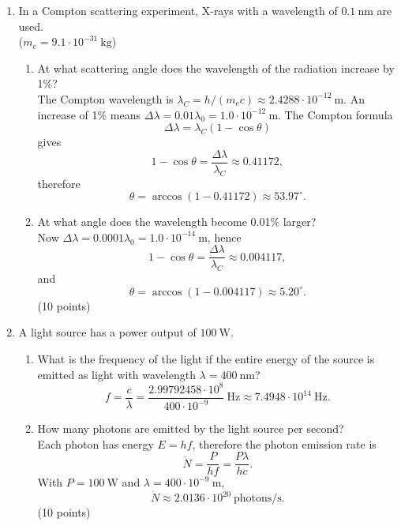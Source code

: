 \documentclass[12pt]{letter}
\begin{document}
\begin{enumerate}

\bigskip
\item In a Compton scattering experiment, X-rays with a wavelength of $0.1\ \text{nm}$ are used.\\
($m_e=9.1\cdot10^{-31}\ \text{kg}$)
\begin{enumerate}
\item At what scattering angle does the wavelength of the radiation increase by 1\%?\\
The Compton wavelength is $\lambda_C = h/(m_e c)\approx 2.4288\cdot10^{-12}\ \text{m}$. An increase of 1\% means $\Delta\lambda = 0.01\lambda_0 = 1.0\cdot10^{-12}\ \text{m}$. The Compton formula
$$ \Delta\lambda=\lambda_C(1-\cos\theta) $$  
gives
$$ 1-\cos\theta=\frac{\Delta\lambda}{\lambda_C}\approx 0.41172,$$
therefore
$$\theta=\arccos(1-0.41172)\approx 53.97^\circ. $$

\item At what angle does the wavelength become 0.01\% larger?\\
Now $\Delta\lambda=0.0001\lambda_0=1.0\cdot10^{-14}\ \text{m}$, hence
$$ 1-\cos\theta=\frac{\Delta\lambda}{\lambda_C}\approx 0.004117,
$$
and
$$\theta=\arccos(1-0.004117)\approx 5.20^\circ. $$
\hfill (10 points)
\end{enumerate}


\bigskip
\item A light source has a power output of $100\ \text{W}$.

\begin{enumerate}
\item What is the frequency of the light if the entire energy of the source is emitted as light with wavelength $\lambda=400\ \text{nm}$?\\
$$ f=\frac{c}{\lambda}=\frac{2.99792458\cdot10^{8}}{400\cdot10^{-9}}\ \text{Hz}\approx 7.4948\cdot10^{14}\ \text{Hz}. $$

\item  How many photons are emitted by the light source per second?\\
Each photon has energy $E=hf$, therefore the photon emission rate is
$$ \dot{N}=\frac{P}{hf}=\frac{P\lambda}{hc}.$$
With $P=100\ \text{W}$ and $\lambda=400\cdot10^{-9}\ \text{m}$,
$$ \dot{N}\approx 2.0136\cdot10^{20}\ \text{photons/s}. $$
\hfill (10 points)
\end{enumerate}


\end{enumerate}
\end{document}
